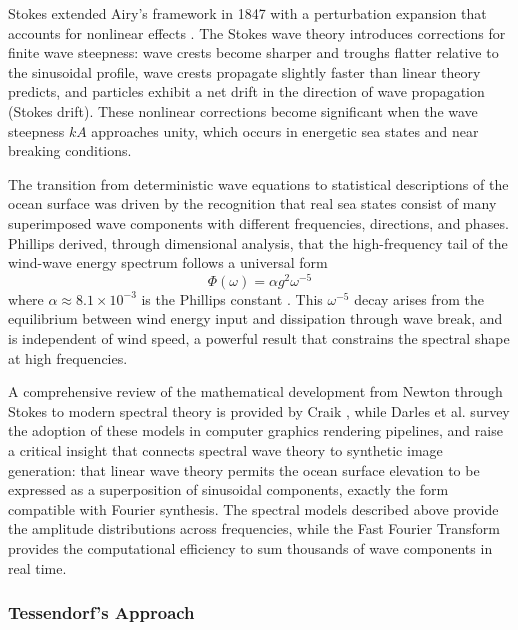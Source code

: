     Stokes extended Airy's framework in 1847 with a perturbation expansion that accounts for nonlinear effects \cite{Stokes1847}. The Stokes wave theory introduces corrections for finite wave steepness: wave crests become sharper and troughs flatter relative to the sinusoidal profile, wave crests propagate slightly faster than linear theory predicts, and particles exhibit a net drift in the direction of wave propagation (Stokes drift). These nonlinear corrections become significant when the wave steepness $kA$ approaches unity, which occurs in energetic sea states and near breaking conditions.

    The transition from deterministic wave equations to statistical descriptions of the ocean surface was driven by the recognition that real sea states consist of many superimposed wave components with different frequencies, directions, and phases. Phillips derived, through dimensional analysis, that the high-frequency tail of the wind-wave energy spectrum follows a universal form
    \begin{equation}
        \Phi(\omega) = \alpha g^2 \omega^{-5}
        \label{eq:phillips_spectrum}
    \end{equation}
    where $\alpha \approx 8.1 \times 10^{-3}$ is the Phillips constant \cite{Phillips1958}. This $\omega^{-5}$ decay arises from the equilibrium between wind energy input and dissipation through wave break, and is independent of wind speed, a powerful result that constrains the spectral shape at high frequencies.

    A comprehensive review of the mathematical development from Newton through Stokes to modern spectral theory is provided by Craik \cite{Craik2004}, while Darles et al. \cite{Darles2011} survey the adoption of these models in computer graphics rendering pipelines, and raise a critical insight that connects spectral wave theory to synthetic image generation: that linear wave theory permits the ocean surface elevation to be expressed as a superposition of sinusoidal components, exactly the form compatible with Fourier synthesis. The spectral models described above provide the amplitude distributions across frequencies, while the Fast Fourier Transform provides the computational efficiency to sum thousands of wave components in real time.

    \subsubsection{Tessendorf's Approach}

